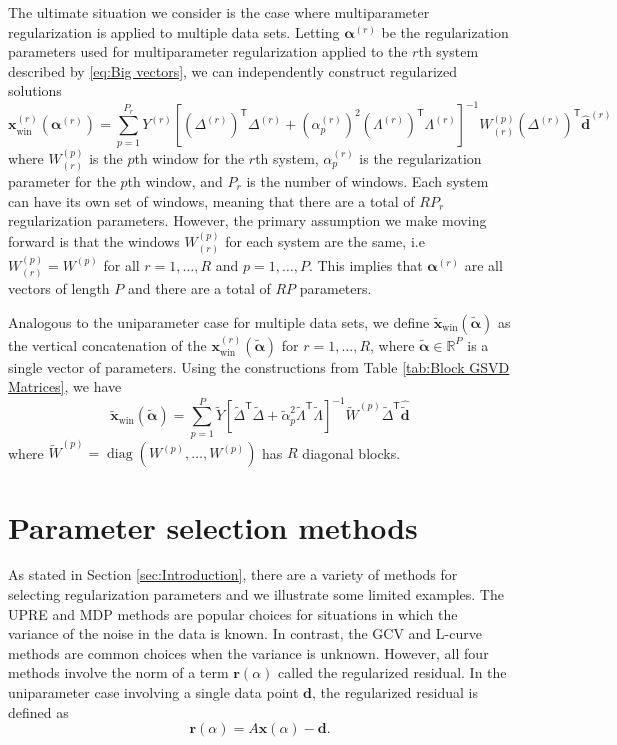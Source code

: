 \documentclass[12pt]{article}
\newcommand{\dVec}{\mathbf{d}}	%
\newcommand{\rVec}{\mathbf{r}}	%
\newcommand{\xVec}{\mathbf{x}}	%
\newcommand{\trans}[1]{{#1}^\mathsf{T}}	%
\newcommand{\inv}[1]{{#1}^{-1}}	%
\DeclareMathOperator{\diag}{diag}	%
\newcommand{\dft}[1]{\widehat{#1}}	%
\newcommand{\regparam}{\alpha}  %
\newcommand{\regparamVec}{\bm{\regparam}}   %
\newcommand{\regparamVecBig}{\widetilde{\regparamVec}}   %
\newcommand{\xReg}{\xVec(\regparam)}	%
\newcommand{\xWin}{\xVec_{\text{win}}}	%
\newcommand{\xBig}{\widetilde{\xVec}}	%
\newcommand{\xWinBig}{\xBig_{\text{win}}}	%
\newcommand{\dBig}{\widetilde{\dVec}}	%
\newcommand{\rReg}{\rVec(\regparam)}	%
\begin{document}
The ultimate situation we consider is the case where multiparameter regularization is applied to multiple data sets. Letting $\regparamVec^{(r)}$ be the regularization parameters used for multiparameter regularization applied to the $r$th system described by \eqref{eq:Big vectors}, we can independently construct regularized solutions
\[\xWin^{(r)}\left(\regparamVec^{(r)}\right) = \sum_{p=1}^{P_r} Y^{(r)}\inv{\left[\trans{\left(\Delta^{(r)}\right)}\Delta^{(r)} + \left(\regparam^{(r)}_p\right)^2 \trans{\left(\Lambda^{(r)}\right)}\Lambda^{(r)}\right]}W^{(p)}_{(r)}\trans{\left(\Delta^{(r)}\right)}\dft{\dVec}^{(r)}\]
where $W^{(p)}_{(r)}$ is the $p$th window for the $r$th system, $\regparam^{(r)}_p$ is the regularization parameter for the $p$th window, and $P_r$ is the number of windows. Each system can have its own set of windows, meaning that there are a total of $RP_r$ regularization parameters. However, the primary assumption we make moving forward is that the windows $W^{(p)}_{(r)}$ for each system are the same, i.e $W^{(p)}_{(r)} = W^{(p)}$ for all $r = 1,\ldots,R$ and $p = 1,\ldots,P$. This implies that $\regparamVec^{(r)}$ are all vectors of length $P$ and there are a total of $RP$ parameters. \par
Analogous to the uniparameter case for multiple data sets, we define $\xWinBig(\regparamVecBig)$ as the vertical concatenation of the $\xWin^{(r)}\left(\regparamVecBig\right)$ for $r = 1,\ldots,R$, where $\regparamVecBig \in \mathbb{R}^P$ is a single vector of parameters. Using the constructions from Table \ref{tab:Block GSVD Matrices}, we have
\begin{equation}
\label{eq:Big Windowed Solution}
    \xWinBig(\regparamVecBig) = \sum_{p=1}^{P} \widetilde{Y}\inv{\left[\trans{\widetilde{\Delta}}\widetilde{\Delta} + \widetilde{\regparam}_p^2 \trans{\widetilde{\Lambda}}\widetilde{\Lambda}\right]}\widetilde{W}^{(p)}\trans{\widetilde{\Delta}}\dft{\dBig}
\end{equation}
where $\widetilde{W}^{(p)} = \diag(W^{(p)},\ldots,W^{(p)})$ has $R$ diagonal blocks.

\section{Parameter selection methods} \label{sec:Methods}
As stated in Section \ref{sec:Introduction}, there are a variety of methods for selecting regularization parameters and we illustrate some limited examples. The UPRE and MDP methods are popular choices for situations in which the variance of the noise in the data is known. In contrast, the GCV and L-curve methods are common choices when the variance is unknown. However, all four methods involve the norm of a term $\rReg$ called the regularized residual. In the uniparameter case involving a single data point $\dVec$, the regularized residual is defined as
\begin{equation}
\label{eq:Regularized Residual}
\rReg = A\xReg - \dVec.
\end{equation}
\end{document}

